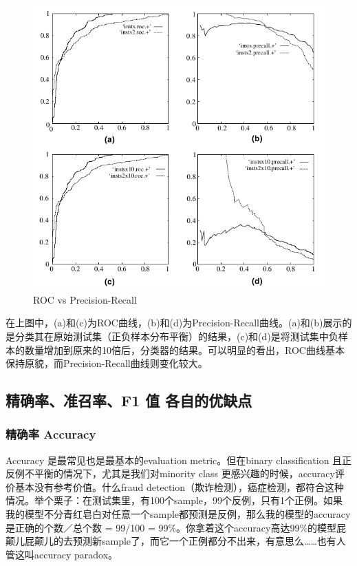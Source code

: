 \documentclass[12pt]{article}
\begin{document}
\begin{figure}[ht]
  \centering
  \includegraphics[width=.8\textwidth]{fig/ROC_vs_Precision_Recall.png} %
  \caption{ROC vs Precision-Recall} %
  \label{ROC_vs_Precision_Recall} %
\end{figure}

在上图中，(a)和(c)为ROC曲线，(b)和(d)为Precision-Recall曲线。(a)和(b)展示的是分类其在原始测试集（正负样本分布平衡）的结果，(c)和(d)是将测试集中负样本的数量增加到原来的10倍后，分类器的结果。可以明显的看出，ROC曲线基本保持原貌，而Precision-Recall曲线则变化较大。

\subsection{精确率、准召率、F1 值 各自的优缺点\cite{Compare_P_R_F1_ROC_AUC}}

\subsubsection{精确率 Accuracy}
Accuracy 是最常见也是最基本的evaluation metric。但在binary classification 且正反例不平衡的情况下，尤其是我们对minority class 更感兴趣的时候，accuracy评价基本没有参考价值。什么fraud detection（欺诈检测），癌症检测，都符合这种情况。举个栗子：在测试集里，有100个sample，99个反例，只有1个正例。如果我的模型不分青红皂白对任意一个sample都预测是反例，那么我的模型的accuracy是正确的个数／总个数 = 99/100 = 99\%。你拿着这个accuracy高达99\%的模型屁颠儿屁颠儿的去预测新sample了，而它一个正例都分不出来，有意思么……也有人管这叫accuracy paradox。
\end{document}
